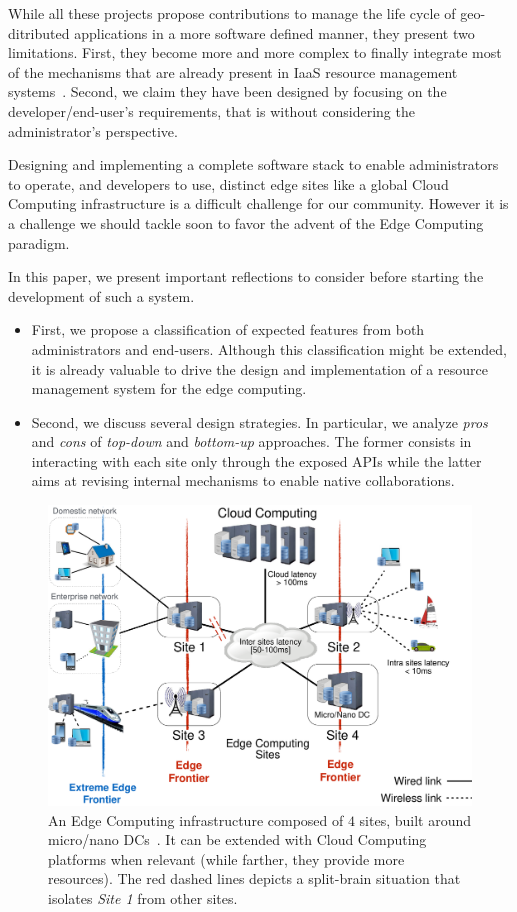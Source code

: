 While all these projects propose contributions to manage the life cycle of
geo-ditributed applications in a more software defined manner, they present two
limitations. First, they become more and more complex to finally
integrate most of the mechanisms that are already present in
IaaS resource management systems~\cite{moreno2012csp, OpenStackCascading}.  Second,
we claim they have been designed by focusing on the developer/end-user's
requirements, that is without considering the administrator's
perspective.

Designing and implementing a complete software stack to enable
administrators to operate, and developers to use, distinct edge sites
like a global Cloud Computing infrastructure is a difficult challenge
for our community. However it is a challenge we should tackle soon to
favor the advent of the Edge Computing paradigm.

In this paper, we
present important reflections to consider before starting the development of such a system.


\begin{itemize}
\item First, we propose a classification of expected features from
  both administrators and end-users. Although this classification might be extended, it is already valuable to drive the design and implementation of a resource management system for the edge computing.
    \item Second, we discuss several design strategies. In particular, we
  analyze \emph{pros} and \emph{cons} of \emph{top-down} and \emph{bottom-up} approaches. The
  former consists in interacting with each site only through the exposed APIs
  while the latter aims at revising internal mechanisms to enable
  native collaborations.
  \end{itemize}

\begin{figure}[t]
  \centering
  \includegraphics[width=\columnwidth]{./figures/figure_fog.pdf}
  \caption{An Edge Computing infrastructure composed of $4$ sites, built around
    micro/nano DCs~\cite{7923796}. It can be extended with Cloud Computing
    platforms when relevant (while farther, they provide more resources).
    The red dashed lines depicts a split-brain situation that isolates
    \emph{Site 1} from other sites.}
  \label{fig:fogedge-archi}
\end{figure}

